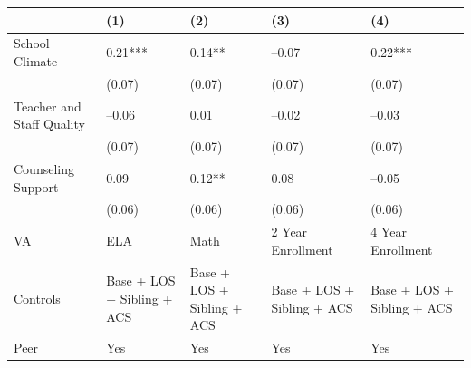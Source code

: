 \documentclass{article}
\begin{document}
\begin{table}[tbp] \centering
{}

{\footnotesize
\begin{tabularx}{\linewidth}{lCCCC}

\toprule
&{(1)}&{(2)}&{(3)}&{(4)} \tabularnewline
\midrule \addlinespace[\belowrulesep]
School Climate&0.21***&0.14**&--0.07&0.22*** \tabularnewline
&(0.07)&(0.07)&(0.07)&(0.07) \tabularnewline
Teacher and Staff Quality&--0.06&0.01&--0.02&--0.03 \tabularnewline
&(0.07)&(0.07)&(0.07)&(0.07) \tabularnewline
Counseling Support&0.09&0.12**&0.08&--0.05 \tabularnewline
&(0.06)&(0.06)&(0.06)&(0.06) \tabularnewline
\midrule VA&ELA&Math&2 Year Enrollment&4 Year Enrollment \tabularnewline
Controls&Base + LOS + Sibling + ACS&Base + LOS + Sibling + ACS&Base + LOS + Sibling + ACS&Base + LOS + Sibling + ACS \tabularnewline
Peer&Yes&Yes&Yes&Yes \tabularnewline
\bottomrule 

\end{tabularx}
}
\end{table}
\end{document}
